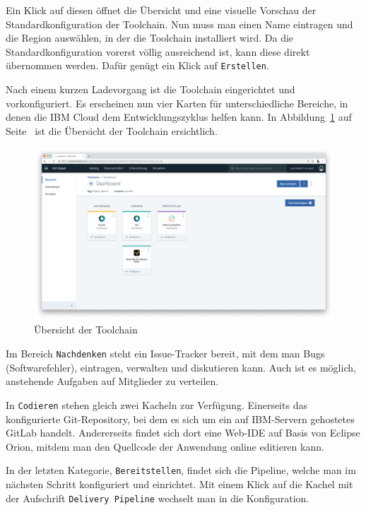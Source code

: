 Ein Klick auf diesen öffnet die Übersicht und eine visuelle Vorschau der Standardkonfiguration der Toolchain. Nun muss
man einen Name eintragen und die Region auswählen, in der die Toolchain installiert wird. Da die Standardkonfiguration
vorerst völlig ausreichend ist, kann diese direkt übernommen werden. Dafür genügt ein Klick auf \texttt{Erstellen}.

Nach einem kurzen Ladevorgang ist die Toolchain eingerichtet und vorkonfiguriert. Es erscheinen nun vier Karten für
unterschiedliche Bereiche, in denen die IBM Cloud dem Entwicklungszyklus helfen kann. In
Abbildung~\ref{fig:umsetzung_toolchain} auf Seite~\pageref{fig:umsetzung_toolchain} ist die Übersicht der Toolchain
ersichtlich.

\begin{figure}[h]
    \centering
    \includegraphics[width=\textwidth]{images/kapitel_3/toolchain_overview.png}
    \caption{Übersicht der Toolchain}
    \label{fig:umsetzung_toolchain}
\end{figure}

Im Bereich \texttt{Nachdenken} steht ein Issue-Tracker bereit, mit dem man Bugs (Softwarefehler), eintragen,
verwalten und diskutieren kann. Auch ist es möglich, anstehende Aufgaben auf Mitglieder zu verteilen.

In \texttt{Codieren} stehen gleich zwei Kacheln zur Verfügung. Einerseits das konfigurierte Git-Repository, bei dem es
sich um ein auf IBM-Servern gehostetes GitLab handelt. Andererseits findet sich dort eine Web-IDE auf Basis von Eclipse
Orion, mitdem man den Quellcode der Anwendung online editieren kann.

In der letzten Kategorie, \texttt{Bereitstellen}, findet sich die Pipeline, welche man im nächsten Schritt konfiguriert
und einrichtet. Mit einem Klick auf die Kachel mit der Aufschrift \texttt{Delivery Pipeline} wechselt man in die
Konfiguration.

